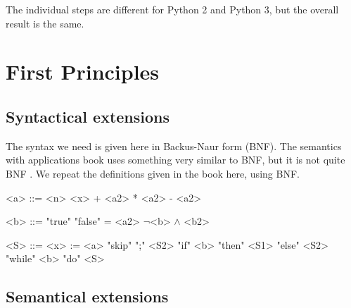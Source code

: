 \documentclass[12pt]{article}
\begin{document}
The individual steps are different for Python 2 and Python 3, but the overall result is the same.

\section{First Principles}

\subsection{Syntactical extensions}

The syntax we need is given here in Backus-Naur form (BNF). The semantics with applications book uses something very similar to BNF, but it is not quite BNF \cite[section 1.2]{wiley}. We repeat the definitions given in the book here, using BNF.

\begin{grammar}
    <a> ::= <n>
    \alt <x>
     + <a2>
     * <a2>
     - <a2>

    <b> ::= "true"
    \alt "false"
     = <a2>
    \alt $\lnot$<b>
     $\land$ <b2>

    <S> ::= <x> := <a>
    \alt "skip"
     ";" <S2>
    \alt "if" <b> "then" <S1> "else" <S2>
    \alt "while" <b> "do" <S>
\end{grammar}

\subsection{Semantical extensions} %

\printbibliography
\end{document}
